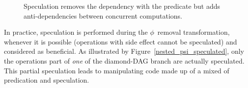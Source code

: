 \begin{figure}[h]
\hfill
{}\hfill
{}\hfill
{}
\caption{\label{fig:pred_versus_spec}Speculation removes the dependency with the predicate but adds anti-dependencies between concurrent computations.}
\end{figure}

In practice, speculation is performed during the $\phi$~removal transformation, whenever it is possible (operations with side effect cannot be speculated) and considered as beneficial. 
As illustrated by Figure~\ref{nested_psi_speculated}, only the operations part of \emph{one} of the diamond-DAG branch are actually speculated. 
This partial speculation leads to manipulating code made up of a mixed of predication and speculation.


